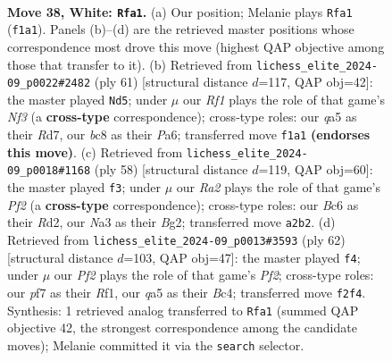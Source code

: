 \documentclass[11pt]{article}
\begin{document}
\begin{figure}[p]
\label{fig:thought-m72}
\end{figure}

\clearpage

\begin{figure}[p]\centering
\begin{subfigure}{0.46\textwidth}\centering
\resizebox{\linewidth}{!}{%
\newchessgame
\chessboard[
  setfen={1rb2r2/p1n2p1k/1pB2Bp1/q2p4/6pP/NP6/R1PNQP2/5RK1 w - - 2 38},
  showmover=false,
  pgfstyle=straightmove, color=movearrow, markmove={f1-a1}
]}
\caption{}
\end{subfigure}\hfill
\begin{subfigure}{0.46\textwidth}\centering
\resizebox{\linewidth}{!}{%
\newchessgame
\chessboard[
  setfen={3r2k1/1p1r1p1p/p4np1/Pb2q3/3N4/R3PPP1/1P1R1KBP/2Q5 b - - 14 31},
  showmover=false,
  pgfstyle=straightmove, color=movearrow, markmove={f6-d5}
]}
\caption{}
\end{subfigure}
\\[4pt]
\begin{subfigure}{0.46\textwidth}\centering
\resizebox{\linewidth}{!}{%
\newchessgame
\chessboard[
  setfen={5k1r/1p2qpp1/p1bp4/4p3/4P1r1/P1N1Q3/1PPR1PB1/3R2K1 w - - 0 30},
  showmover=false,
  pgfstyle=straightmove, color=movearrow, markmove={f2-f3}
]}
\caption{}
\end{subfigure}\hfill
\begin{subfigure}{0.46\textwidth}\centering
\resizebox{\linewidth}{!}{%
\newchessgame
\chessboard[
  setfen={4qrk1/rpn3p1/1Np1pbp1/2P5/1pBPQ1P1/8/P4PK1/3R1R2 w - - 2 32},
  showmover=false,
  pgfstyle=straightmove, color=movearrow, markmove={f2-f4}
]}
\caption{}
\end{subfigure}
\caption{\textbf{Move 38, White: \texttt{Rfa1}.} (a) Our position; Melanie plays \texttt{Rfa1} (\texttt{f1a1}). Panels (b)--(d) are the retrieved master positions whose correspondence most drove this move (highest QAP objective among those that transfer to it). (b) Retrieved from \texttt{lichess\_elite\_2024-09\_p0022\#2482} (ply 61) [structural distance $d$=117, QAP obj=42]: the master played \texttt{Nd5}; under $\mu$ our \emph{Rf1} plays the role of that game's \emph{Nf3} (a \textbf{cross-type} correspondence); cross-type roles: our \emph{q}a5 as their \emph{R}d7, our \emph{b}c8 as their \emph{P}a6; transferred move \texttt{f1a1} \textbf{(endorses this move)}. (c) Retrieved from \texttt{lichess\_elite\_2024-09\_p0018\#1168} (ply 58) [structural distance $d$=119, QAP obj=60]: the master played \texttt{f3}; under $\mu$ our \emph{Ra2} plays the role of that game's \emph{Pf2} (a \textbf{cross-type} correspondence); cross-type roles: our \emph{B}c6 as their \emph{R}d2, our \emph{N}a3 as their \emph{B}g2; transferred move \texttt{a2b2}. (d) Retrieved from \texttt{lichess\_elite\_2024-09\_p0013\#3593} (ply 62) [structural distance $d$=103, QAP obj=47]: the master played \texttt{f4}; under $\mu$ our \emph{Pf2} plays the role of that game's \emph{Pf2}; cross-type roles: our \emph{p}f7 as their \emph{R}f1, our \emph{q}a5 as their \emph{B}c4; transferred move \texttt{f2f4}. Synthesis: 1 retrieved analog transferred to \texttt{Rfa1} (summed QAP objective 42, the strongest correspondence among the candidate moves); Melanie committed it via the \texttt{search} selector.}

\end{figure}
\end{document}
